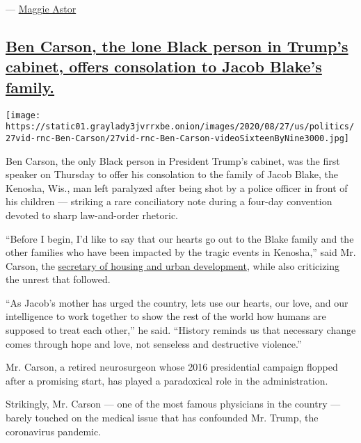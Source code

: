 --- \href{https://www.nytimes3xbfgragh.onion/by/maggie-astor}{Maggie
Astor}

\hypertarget{ben-carson-the-lone-black-person-in-trumps-cabinet-offers-consolation-to-jacob-blakes-family}{%
\subsection{\texorpdfstring{\protect\hyperlink{ben-carson-the-lone-black-person-in-trumps-cabinet-offers-consolation-to-jacob-blakes-family}{Ben
Carson, the lone Black person in Trump's cabinet, offers consolation to
Jacob Blake's
family.}}{Ben Carson, the lone Black person in Trump's cabinet, offers consolation to Jacob Blake's family.}}\label{ben-carson-the-lone-black-person-in-trumps-cabinet-offers-consolation-to-jacob-blakes-family}}

\texttt{[image: https://static01.graylady3jvrrxbe.onion/images/2020/08/27/us/politics/27vid-rnc-Ben-Carson/27vid-rnc-Ben-Carson-videoSixteenByNine3000.jpg]}

Ben Carson, the only Black person in President Trump's cabinet, was the
first speaker on Thursday to offer his consolation to the family of
Jacob Blake, the Kenosha, Wis., man left paralyzed after being shot by a
police officer in front of his children --- striking a rare conciliatory
note during a four-day convention devoted to sharp law-and-order
rhetoric.

``Before I begin, I'd like to say that our hearts go out to the Blake
family and the other families who have been impacted by the tragic
events in Kenosha,'' said Mr. Carson, the
\href{https://www.nytimes3xbfgragh.onion/2018/03/05/us/ben-carson-hud.html}{secretary
of housing and urban development}, while also criticizing the unrest
that followed.

``As Jacob's mother has urged the country, lets use our hearts, our
love, and our intelligence to work together to show the rest of the
world how humans are supposed to treat each other,'' he said. ``History
reminds us that necessary change comes through hope and love, not
senseless and destructive violence.''

Mr. Carson, a retired neurosurgeon whose 2016 presidential campaign
flopped after a promising start, has played a paradoxical role in the
administration.

Strikingly, Mr. Carson --- one of the most famous physicians in the
country --- barely touched on the medical issue that has confounded Mr.
Trump, the coronavirus pandemic.

